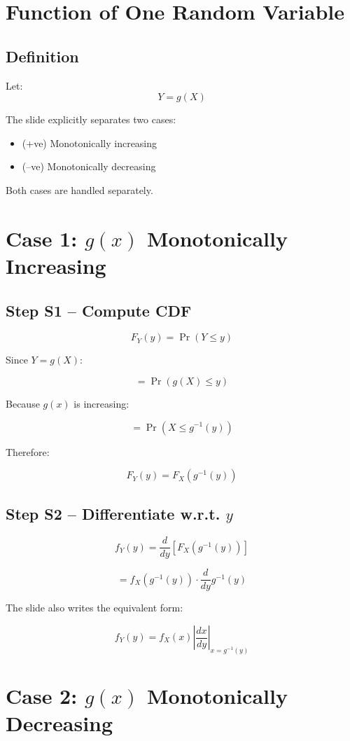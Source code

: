 \documentclass[12pt]{article}
\begin{document}
\section{Function of One Random Variable}

\subsection{Definition}

Let:
\[
Y = g(X)
\]

The slide explicitly separates two cases:

\begin{itemize}
    \item (+ve) Monotonically increasing
    \item (–ve) Monotonically decreasing
\end{itemize}

Both cases are handled separately.

\section{Case 1: \( g(x) \) Monotonically Increasing}

\subsection{Step S1 – Compute CDF}

\[
F_Y(y) = \Pr(Y \le y)
\]

Since \( Y = g(X) \):

\[
= \Pr(g(X) \le y)
\]

Because \( g(x) \) is increasing:

\[
= \Pr(X \le g^{-1}(y))
\]

Therefore:

\[
F_Y(y) = F_X(g^{-1}(y))
\]

\subsection{Step S2 – Differentiate w.r.t. \( y \)}

\[
f_Y(y) = \frac{d}{dy}\left[F_X(g^{-1}(y))\right]
\]

\[
= f_X(g^{-1}(y)) \cdot \frac{d}{dy}g^{-1}(y)
\]

The slide also writes the equivalent form:

\[
f_Y(y) = f_X(x)\left|\frac{dx}{dy}\right|_{x=g^{-1}(y)}
\]

\section{Case 2: \( g(x) \) Monotonically Decreasing}
\end{document}
